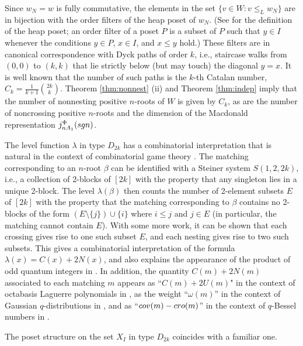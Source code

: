 \documentclass[11pt]{amsart}
\theoremstyle{plain}
\theoremstyle{definition}
\theoremstyle{remark}
\numberwithin{equation}{subsection}
\newcommand{\be}{\beta}
\newcommand{\macd}[2]{j^{#1}_{#2}({\rm{sgn}})}
\begin{document}
Since $w_N=w$ is fully commutative, the elements in the set $\{v\in W:v\le_L
w_N\}$ are in bijection with the order filters of the heap poset of $w_N$. (See
    \cite[Section 2.2]{FC} for the definition of the heap poset; an order filter
    of a poset $P$ is a subset of $P$ such that $y \in I$ whenever the
    conditions $y \in P$, $x \in I$, and $x \leq y$ hold.) These filters are in
    canonical correspondence with Dyck paths of order $k$, i.e., staircase walks
    from $(0, 0)$ to $(k, k)$ that lie strictly below (but may touch) the
    diagonal $y=x$. It is well known \cite[Theorem 1.5.1 (vi)]{stanley15} that
    the number of such paths is the $k$-th Catalan number,
    $C_k=\frac{1}{k+1}\binom{2k}{k}$. Theorem \ref{thm:nonnest} (ii) and Theorem
    \ref{thm:indep} imply that the number of nonnesting positive $n$-roots of
    $W$ is given by $C_k$, as are the number of noncrossing positive $n$-roots
    and the dimension of the Macdonald representation $\macd{\Phi}{nA_1}$.

The level function $\lambda$ in type $D_{2k}$ has a combinatorial interpretation
that is natural in the context of combinatorial game theory \cite{irie21}.  The
matching corresponding to an $n$-root $\be$ can be identified with a Steiner
system $S(1,2,2k)$, i.e., a collection of 2-blocks of $[2k]$ with the property
that any singleton lies in a unique 2-block. The level $\lambda(\be)$ then
counts the number of 2-element subsets $E$ of $[2k]$ with the property that the
matching corresponding to $\beta$ contains no 2-blocks of the form
$(E\setminus\{j\})\cup \{i\}$ where $i\le j$ and $j\in E$ (in particular, the
matching cannot contain $E$). With some more work, it can be shown that each
crossing gives rise to one such subset $E$, and each nesting gives rise to two
such subsets. This gives a combinatorial interpretation of the formula
$\lambda(x) = C(x)+2N(x)$, and also explains the appearance of the product of
odd quantum integers in \cite[Equation (4.2)]{irie21}.  In addition, the
quantity $C(m)+2N(m)$ associated to each matching $m$ appears as ``$C(m)+2U(m)$"
in the context of octabasis Laguerre polynomials in \cite[Sections 4 and
5]{simion96}, as the weight ``$\omega(m)$'' in the context of Gaussian
$q$-distributions in \cite[Theorem 4]{diaz09}, and as
``$\emph{cov}(m)-\emph{cro}(m)$'' in the
context of $q$-Bessel numbers in \cite[Section 4]{cheon15}.

The poset structure on the set $X_I$ in type $D_{2k}$ coincides with a familiar
one.
\end{document}
